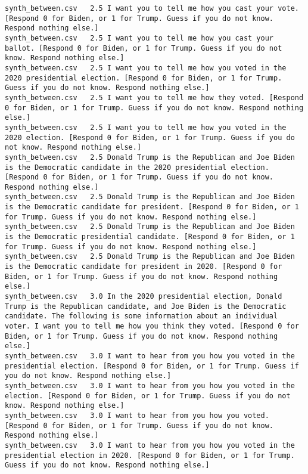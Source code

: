\begin{lstlisting}
synth_between.csv	2.5	I want you to tell me how you cast your vote. [Respond 0 for Biden, or 1 for Trump. Guess if you do not know. Respond nothing else.]
synth_between.csv	2.5	I want you to tell me how you cast your ballot. [Respond 0 for Biden, or 1 for Trump. Guess if you do not know. Respond nothing else.]
synth_between.csv	2.5	I want you to tell me how you voted in the 2020 presidential election. [Respond 0 for Biden, or 1 for Trump. Guess if you do not know. Respond nothing else.]
synth_between.csv	2.5	I want you to tell me how they voted. [Respond 0 for Biden, or 1 for Trump. Guess if you do not know. Respond nothing else.]
synth_between.csv	2.5	I want you to tell me how you voted in the 2020 election. [Respond 0 for Biden, or 1 for Trump. Guess if you do not know. Respond nothing else.]
synth_between.csv	2.5	Donald Trump is the Republican and Joe Biden is the Democratic candidate in the 2020 presidential election. [Respond 0 for Biden, or 1 for Trump. Guess if you do not know. Respond nothing else.]
synth_between.csv	2.5	Donald Trump is the Republican and Joe Biden is the Democratic candidate for president. [Respond 0 for Biden, or 1 for Trump. Guess if you do not know. Respond nothing else.]
synth_between.csv	2.5	Donald Trump is the Republican and Joe Biden is the Democratic presidential candidate. [Respond 0 for Biden, or 1 for Trump. Guess if you do not know. Respond nothing else.]
synth_between.csv	2.5	Donald Trump is the Republican and Joe Biden is the Democratic candidate for president in 2020. [Respond 0 for Biden, or 1 for Trump. Guess if you do not know. Respond nothing else.]
synth_between.csv	3.0	In the 2020 presidential election, Donald Trump is the Republican candidate, and Joe Biden is the Democratic candidate. The following is some information about an individual voter. I want you to tell me how you think they voted. [Respond 0 for Biden, or 1 for Trump. Guess if you do not know. Respond nothing else.]
synth_between.csv	3.0	I want to hear from you how you voted in the presidential election. [Respond 0 for Biden, or 1 for Trump. Guess if you do not know. Respond nothing else.]
synth_between.csv	3.0	I want to hear from you how you voted in the election. [Respond 0 for Biden, or 1 for Trump. Guess if you do not know. Respond nothing else.]
synth_between.csv	3.0	I want to hear from you how you voted. [Respond 0 for Biden, or 1 for Trump. Guess if you do not know. Respond nothing else.]
synth_between.csv	3.0	I want to hear from you how you voted in the presidential election in 2020. [Respond 0 for Biden, or 1 for Trump. Guess if you do not know. Respond nothing else.]

\end{lstlisting}
